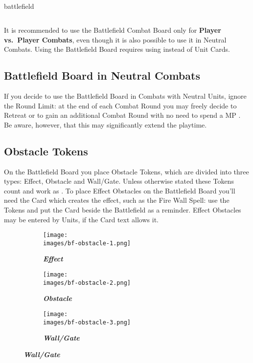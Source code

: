 \pagebreak
\begin{expansion}{battlefield}
  \begin{multicols*}{2}
  \subsection*{}
  It is recommended to use the Battlefield Combat Board only for \textbf{Player vs.~Player Combats}, even though it is also possible to use it in Neutral Combats.
  Using the Battlefield Board requires using  instead of Unit Cards.

  \medskip
  \subsection*{Battlefield Board in Neutral Combats}
  If you decide to use the Battlefield Board in Combats with Neutral Units, ignore the Round Limit:
  at the end of each Combat Round you may freely decide to Retreat or to gain an additional Combat Round with no need to spend a MP .
  Be aware, however, that this may significantly extend the playtime.

  \medskip
  \subsection*{Obstacle Tokens}
  On the Battlefield Board you place Obstacle Tokens, which are divided into three types:
  Effect, Obstacle and Wall/Gate.
  Unless otherwise stated these Tokens count and work as .
  To place Effect Obstacles on the Battlefield Board you'll need the Card which creates the effect, such as the Fire Wall Spell: use the Tokens and put the Card beside the Battlefield as a reminder.
  Effect Obstacles may be entered by Units, if the Card text allows it.
  \vspace*{1em}
  \begin{figure}[H]
    \centering
    \begin{subfigure}[b]{0.3\linewidth}
      \centering
      \texttt{[image: \\images/bf-obstacle-1.png]}
      \caption{\textbf{\textit{\textcolor{darkcandyapplered}{Effect}}}}
    \end{subfigure}
    \begin{subfigure}[b]{0.3\linewidth}
      \centering
      \texttt{[image: \\images/bf-obstacle-2.png]}
      \caption{\textbf{\textit{\textcolor{darkcandyapplered}{Obstacle}}}}
    \end{subfigure}
    \begin{subfigure}[b]{0.3\linewidth}
      \centering
      \texttt{[image: \\images/bf-obstacle-3.png]}
      \caption{\textbf{\textit{\textcolor{darkcandyapplered}{Wall/Gate}}}}
    \end{subfigure}
  \end{figure}
  \vspace*{1em}
  \columnbreak


\end{multicols*}
\end{expansion}
